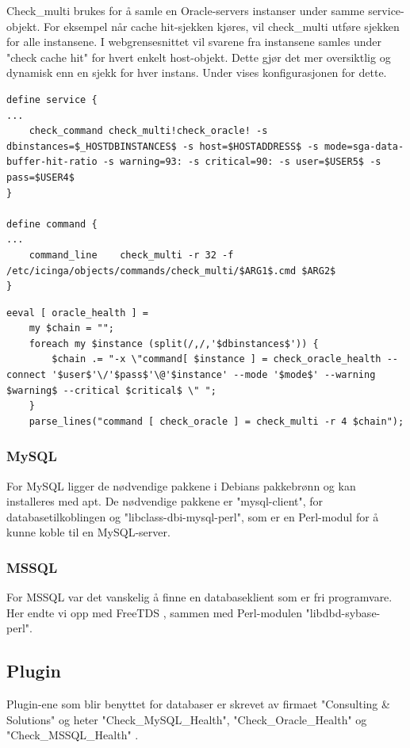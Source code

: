 Check\_multi brukes for å samle en Oracle-servers instanser under samme service-objekt. For eksempel når cache hit-sjekken kjøres, vil check\_multi utføre sjekken for alle instansene. I webgrensesnittet vil svarene fra instansene samles under "check cache hit" for hvert enkelt host-objekt. Dette gjør det mer oversiktlig og dynamisk enn en sjekk for hver instans. Under vises konfigurasjonen for dette.

\begin{lstlisting}[style=example]
define service {
...
    check_command check_multi!check_oracle! -s dbinstances=$_HOSTDBINSTANCES$ -s host=$HOSTADDRESS$ -s mode=sga-data-buffer-hit-ratio -s warning=93: -s critical=90: -s user=$USER5$ -s pass=$USER4$
}

define command {
...
	command_line	check_multi -r 32 -f /etc/icinga/objects/commands/check_multi/$ARG1$.cmd $ARG2$
}
\end{lstlisting}
\begin{lstlisting}[style=example]
eeval [ oracle_health ] =
    my $chain = "";
    foreach my $instance (split(/,/,'$dbinstances$')) {
        $chain .= "-x \"command[ $instance ] = check_oracle_health --connect '$user$'\/'$pass$'\@'$instance' --mode '$mode$' --warning $warning$ --critical $critical$ \" ";
    }
    parse_lines("command [ check_oracle ] = check_multi -r 4 $chain");
\end{lstlisting}

\subsubsection{MySQL}
For MySQL ligger de nødvendige pakkene i Debians pakkebrønn og kan installeres med apt. De nødvendige pakkene er "mysql-client", for databasetilkoblingen og "libclass-dbi-mysql-perl", som er en Perl-modul for å kunne koble til en MySQL-server.

\subsubsection{MSSQL}
For MSSQL var det vanskelig å finne en databaseklient som er fri programvare. Her endte vi opp med FreeTDS \cite{freetds}, sammen med Perl-modulen "libdbd-sybase-perl".

\subsection{Plugin}
Plugin-ene som blir benyttet for databaser er skrevet av firmaet "Consulting \& Solutions" og heter "Check\_MySQL\_Health", "Check\_Oracle\_Health" og "Check\_MSSQL\_Health" \cite{consol}.

